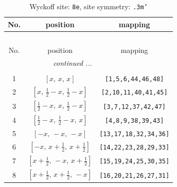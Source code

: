 \documentclass[fleqn,8pt]{jsarticle}
\begin{document}
\renewcommand{\arraystretch}{1.2}
\begin{longtable}{ccc}
\caption{Wyckoff site: {\tt 8e}, site symmetry: {\tt .3m'}}
 \\
 \hline \hline
No. & position & mapping \\ \hline \endfirsthead

\multicolumn{2}{l}{\tablename\ \thetable{}} \\
 \hline \hline
No. & position & mapping \\ \hline \endhead

 \hline \hline
\multicolumn{2}{r}{\footnotesize\it continued ...} \\ \endfoot

 \hline \hline
\multicolumn{2}{r}{} \\ \endlastfoot

1 & $\left[ x,\, x,\, x \right]$ & {\tt [1,5,6,44,46,48]} \\ \hline
2 & $\left[ x,\, \frac{1}{2} - x,\, \frac{1}{2} - x \right]$ & {\tt [2,10,11,40,41,45]} \\ \hline
3 & $\left[ \frac{1}{2} - x,\, x,\, \frac{1}{2} - x \right]$ & {\tt [3,7,12,37,42,47]} \\ \hline
4 & $\left[ \frac{1}{2} - x,\, \frac{1}{2} - x,\, x \right]$ & {\tt [4,8,9,38,39,43]} \\ \hline
5 & $\left[ - x,\, - x,\, - x \right]$ & {\tt [13,17,18,32,34,36]} \\ \hline
6 & $\left[ - x,\, x + \frac{1}{2},\, x + \frac{1}{2} \right]$ & {\tt [14,22,23,28,29,33]} \\ \hline
7 & $\left[ x + \frac{1}{2},\, - x,\, x + \frac{1}{2} \right]$ & {\tt [15,19,24,25,30,35]} \\ \hline
8 & $\left[ x + \frac{1}{2},\, x + \frac{1}{2},\, - x \right]$ & {\tt [16,20,21,26,27,31]} \\
\end{longtable}
\renewcommand{\arraystretch}{1.2}
\end{document}
